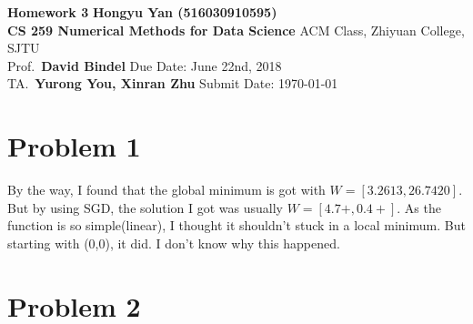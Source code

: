 \documentclass[a4paper, 11pt]{article}
\begin{document}
\noindent
\large\textbf{Homework 3} \hfill \textbf{Hongyu Yan (516030910595)} \\
\normalsize {\bf CS 259 Numerical Methods for Data Science} \hfill ACM Class, Zhiyuan College, SJTU\\
Prof.~{\bf David Bindel} \hfill Due Date: June 22nd, 2018\\
TA.~{\bf Yurong You, Xinran Zhu} \hfill Submit Date: \today

\section*{Problem 1}
\lipsum[1]
By the way, I found that the global minimum is got with $W = [3.2613, 26.7420]$. 
But by using SGD, the solution I got was usually $W = [4.7+, 0.4+]$.
As the function is so simple(linear), I thought it shouldn't stuck in a local minimum. But starting
with (0,0), it did. I don't know why this happened.

\section*{Problem 2}
\lipsum[2]
\end{document}
